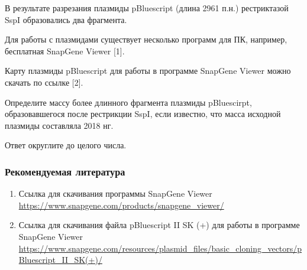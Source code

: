 
В результате разрезания плазмиды pBluescript (длина 2961 п.н.) рестриктазой SspI образовались два фрагмента.

Для работы с плазмидами существует несколько программ для ПК, например, бесплатная SnapGene Viewer [1].

Карту плазмиды pBluescript для работы в программе SnapGene Viewer можно скачать по ссылке [2].

Определите массу более длинного фрагмента плазмиды pBluescirpt, образовавшегося после рестрикции SspI, если известно, что масса исходной плазмиды составляла 2018 нг.

Ответ округлите до целого числа. 

\subsubsection*{Рекомендуемая литература}

\begin{enumerate}
    \item Ссылка для скачивания программы SnapGene Viewer \url{https://www.snapgene.com/products/snapgene_viewer/}
    \item Ссылка для скачивания файла pBluescript II SK (+) для работы в программе SnapGene Viewer \url{https://www.snapgene.com/resources/plasmid_files/basic_cloning_vectors/pBluescript_II_SK(+)/}
\end{enumerate}
